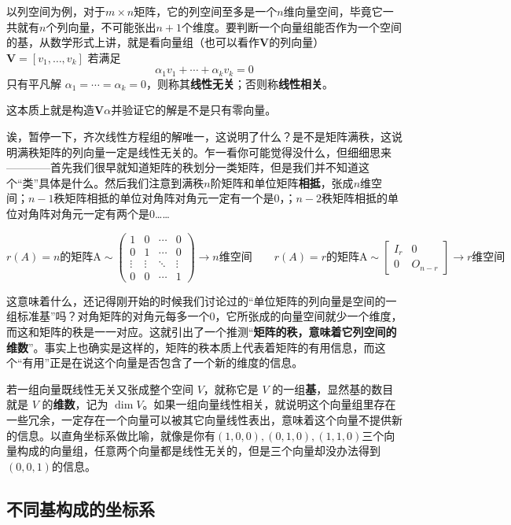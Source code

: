 \documentclass[UTF8]{ctexbook}
\begin{document}
以列空间为例，对于$m\times n$矩阵，它的列空间至多是一个$n$维向量空间，毕竟它一共就有$n$个列向量，不可能张出$n+1$个维度。要判断一个向量组能否作为一个空间的基，从数学形式上讲，就是看向量组（也可以看作$\mathbf{V}$的列向量） $\mathbf{V}=[v_1,\dots,v_k]$ 若满足
\[
\alpha_1v_1+\cdots+\alpha_kv_k=0
\]
只有平凡解 $\alpha_1=\cdots=\alpha_k=0$，则称其\textbf{线性无关}；否则称\textbf{线性相关}。

这本质上就是构造$\mathbf{V}\alpha$并验证它的解是不是只有零向量。

诶，暂停一下，齐次线性方程组的解唯一，这说明了什么？是不是矩阵满秩，这说明满秩矩阵的列向量一定是线性无关的。乍一看你可能觉得没什么，但细细思来————首先我们很早就知道矩阵的秩划分一类矩阵，但是我们并不知道这个“类”具体是什么。然后我们注意到满秩$n$阶矩阵和单位矩阵\textbf{相抵}，张成$n$维空间；$n-1$秩矩阵相抵的单位对角阵对角元一定有一个是0，；$n-2$秩矩阵相抵的单位对角阵对角元一定有两个是0……

\[
r(A)=n\text{的矩阵A}
\sim
\begin{pmatrix}
1 & 0 & \cdots & 0 \\
0 & 1 & \cdots & 0 \\
\vdots & \vdots & \ddots & \vdots \\
0 & 0 & \cdots & 1
\end{pmatrix}
\rightarrow
n\text{维空间}
\qquad
r(A)=r\text{的矩阵A}
\sim
\begin{bmatrix}
I_r & 0\\
0 & O_{n-r}
\end{bmatrix}
\rightarrow
r\text{维空间}
\]

这意味着什么，还记得刚开始的时候我们讨论过的“单位矩阵的列向量是空间的一组标准基”吗？对角矩阵的对角元每多一个0，它所张成的向量空间就少一个维度，而这和矩阵的秩是一一对应。这就引出了一个推测“\textbf{矩阵的秩，意味着它列空间的维数}”。事实上也确实是这样的，矩阵的秩本质上代表着矩阵的有用信息，而这个“有用”正是在说这个向量是否包含了一个新的维度的信息。

若一组向量既线性无关又张成整个空间 $V$，就称它是 $V$ 的一组\textbf{基}，显然基的数目就是 $V$ 的\textbf{维数}，记为 $\dim V$。如果一组向量线性相关，就说明这个向量组里存在一些冗余，一定存在一个向量可以被其它向量线性表出，意味着这个向量不提供新的信息。以直角坐标系做比喻，就像是你有$(1,0,0),(0,1,0),(1,1,0)$三个向量构成的向量组，任意两个向量都是线性无关的，但是三个向量却没办法得到$(0,0,1)$的信息。

\subsection{不同基构成的坐标系}
\end{document}
